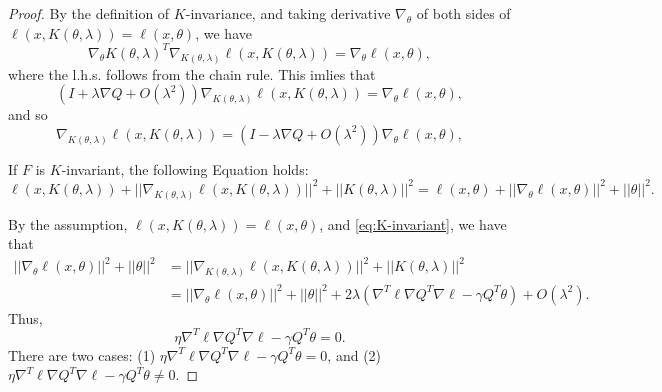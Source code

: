 \documentclass{article}
\theoremstyle{plain}
\begin{document}
\begin{proof}

By the definition of $K$-invariance,
and taking derivative $\nabla_\theta$ of both sides of $\ell(x,K(\theta,\lambda)) = \ell(x,\theta)$, we have
\begin{equation}
\nabla_\theta K(\theta,\lambda)^T\nabla_{K(\theta,\lambda)}\ell(x,K(\theta,\lambda))=\nabla_\theta\ell(x,\theta),
\end{equation}
where the l.h.s. follows from the chain rule. This imlies that 
\begin{equation}
    (I + \lambda \nabla Q + O(\lambda^2))\nabla_{K(\theta,\lambda)}\ell(x,K(\theta,\lambda))=\nabla_\theta\ell(x,\theta),
\end{equation}
and so
\begin{equation}
   \nabla_{K(\theta,\lambda)}\ell(x,K(\theta,\lambda))=  (I - \lambda \nabla Q + O(\lambda^2))\nabla_\theta\ell(x,\theta),
\end{equation}

If $F$ is $K$-invariant, the following Equation holds:
\begin{equation}
\ell(x,K(\theta,\lambda))+||\nabla_{K(\theta,\lambda)}\ell(x,K(\theta,\lambda))||^2+||K(\theta,\lambda)||^2=\ell(x,\theta)+||\nabla_\theta\ell(x,\theta)||^2+||\theta||^2.
\label{eq:K-invariant}
\end{equation}

By the assumption, $\ell(x,K(\theta,\lambda))=\ell(x,\theta)$, and \eqref{eq:K-invariant}, we have that 
\begin{align}
||\nabla_\theta\ell(x,\theta)||^2 + ||\theta||^2 & = ||\nabla_{K(\theta,\lambda)}\ell(x,K(\theta,\lambda))||^2 + ||K(\theta,\lambda)||^2\\ 
&= ||\nabla_\theta\ell(x,\theta)||^2 + ||\theta||^2 + 2\lambda ( \nabla^T\ell\nabla Q^T \nabla \ell - \gamma  Q^T\theta)+ O(\lambda^2).
\end{align}
Thus, 
\begin{equation}
    \eta \nabla^T\ell\nabla Q^T \nabla \ell - \gamma  Q^T\theta = 0.
\end{equation}
There are two cases: (1) $\eta \nabla^T\ell\nabla Q^T \nabla \ell - \gamma Q^T\theta=0 $, and (2) $\eta \nabla^T\ell\nabla Q^T \nabla \ell - \gamma Q^T\theta \neq 0 $. 


\end{proof}
\end{document}
